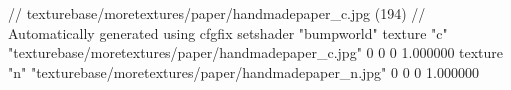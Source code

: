 // texturebase/moretextures/paper/handmadepaper_c.jpg (194)
// Automatically generated using cfgfix
setshader "bumpworld"
texture "c" "texturebase/moretextures/paper/handmadepaper_c.jpg" 0 0 0 1.000000
texture "n" "texturebase/moretextures/paper/handmadepaper_n.jpg" 0 0 0 1.000000
